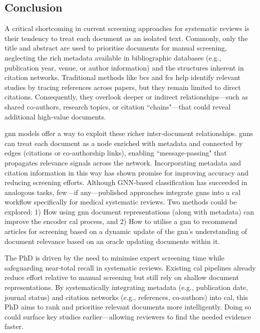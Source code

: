 \documentclass[10pt,oneside]{book}
\begin{document}
\subsection{Conclusion}

A critical shortcoming in current screening approaches for systematic reviews is their tendency to treat each document as an isolated text. Commonly, only the title and abstract are used to prioritise documents for manual screening, neglecting the rich metadata available in bibliographic databases (e.g., publication year, venue, or author information) and the structures inherent in citation networks. Traditional methods like \gls*{bcs} and \gls*{fcs} help identify relevant studies by tracing references across papers, but they remain limited to direct citations. Consequently, they overlook deeper or indirect relationships—such as shared co‐authors, research topics, or citation ``chains"—that could reveal additional high‐value documents.

\gls*{gnn} models offer a way to exploit these richer inter‐document relationships. \gls*{gnn}s can treat each document as a node enriched with metadata and connected by edges (citations or co‐authorship links), enabling ``message‐passing" that propagates relevance signals across the network. Incorporating metadata and citation information in this way has shown promise for improving accuracy and reducing screening efforts. Although GNN‐based classification has succeeded in analogous tasks, few—if any—published approaches integrate \gls*{gnn}s into a \gls*{cal} workflow specifically for medical systematic reviews. Two methods could be explored: 1) How using \gls*{gnn} document representations (along with metadata) can improve the encoder \gls*{cal} process, and 2) How to utilise a \gls*{gnn} to recommend articles for screening based on a dynamic update of the \gls*{gnn}'s understanding of document relevance based on an oracle updating documents within it. 

The PhD is driven by the need to minimise expert screening time while safeguarding near‐total recall in systematic reviews. Existing \gls*{cal} pipelines already reduce effort relative to manual screening but still rely on shallow document representations. By systematically integrating metadata (e.g., publication date, journal status) and citation networks (e.g., references, co‐authors) into \gls*{cal}, this PhD aims to rank and prioritise relevant documents more intelligently. Doing so could surface key studies earlier—allowing reviewers to find the needed evidence faster.
\end{document}
